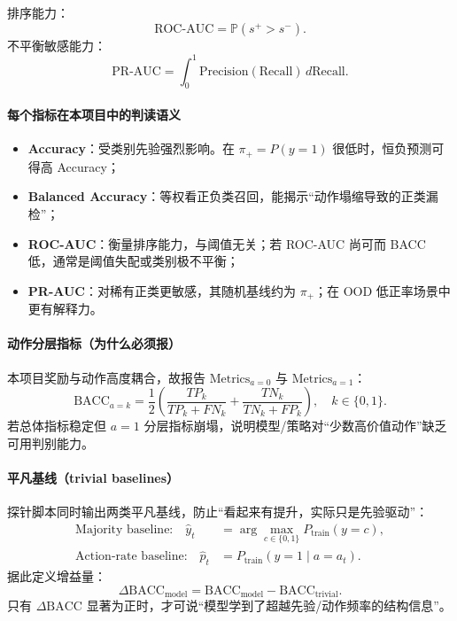 ﻿\documentclass[11pt,a4paper]{ctexart}
\begin{document}
排序能力：
\begin{equation}
\mathrm{ROC\text{-}AUC}=\mathbb{P}(s^+>s^-).
\end{equation}
不平衡敏感能力：
\begin{equation}
\mathrm{PR\text{-}AUC}=\int_0^1 \mathrm{Precision}(\mathrm{Recall})\,d\mathrm{Recall}.
\end{equation}

\paragraph{每个指标在本项目中的判读语义}
\begin{itemize}
  \item \textbf{Accuracy}：受类别先验强烈影响。在 \(\pi_+=P(y=1)\) 很低时，恒负预测可得高 Accuracy；
  \item \textbf{Balanced Accuracy}：等权看正负类召回，能揭示“动作塌缩导致的正类漏检”；
  \item \textbf{ROC-AUC}：衡量排序能力，与阈值无关；若 ROC-AUC 尚可而 BACC 低，通常是阈值失配或类别极不平衡；
  \item \textbf{PR-AUC}：对稀有正类更敏感，其随机基线约为 \(\pi_+\)；在 OOD 低正率场景中更有解释力。
\end{itemize}

\paragraph{动作分层指标（为什么必须报）}
本项目奖励与动作高度耦合，故报告
\(\text{Metrics}_{a=0}\) 与 \(\text{Metrics}_{a=1}\)：
\begin{equation}
\text{BACC}_{a=k}
=\frac{1}{2}
\left(
\frac{TP_k}{TP_k+FN_k}
+
\frac{TN_k}{TN_k+FP_k}
\right),\quad k\in\{0,1\}.
\end{equation}
若总体指标稳定但 \(a=1\) 分层指标崩塌，说明模型/策略对“少数高价值动作”缺乏可用判别能力。

\paragraph{平凡基线（trivial baselines）}
探针脚本同时输出两类平凡基线，防止“看起来有提升，实际只是先验驱动”：
\begin{align}
\text{Majority baseline:}\quad
\hat y_t &= \arg\max_{c\in\{0,1\}} P_{\text{train}}(y=c),\\
\text{Action-rate baseline:}\quad
\hat p_t &= P_{\text{train}}(y=1\mid a=a_t).
\end{align}
据此定义增益量：
\begin{equation}
\Delta\text{BACC}_{\text{model}}
=\text{BACC}_{\text{model}}
-\text{BACC}_{\text{trivial}}.
\end{equation}
只有 \(\Delta\text{BACC}\) 显著为正时，才可说“模型学到了超越先验/动作频率的结构信息”。
\end{document}
